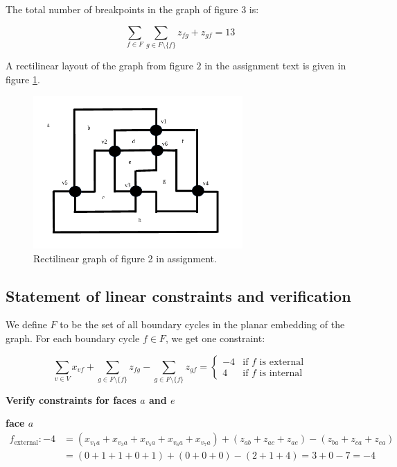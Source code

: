 The total number of breakpoints in the graph of figure 3 is:

$$ \sum_{f\in F} \sum_{g \in F \setminus{\{f\} }} {z_{fg} + z_{gf} }= 13$$

A rectilinear layout of the graph from figure $2$ in the assignment text is given in figure \ref{fig:reclayout}.

\begin{figure}
 \centering
 \includegraphics[keepaspectratio=true, width=80mm]{img/rectilinear_graph.png}
 \caption{Rectilinear graph of figure 2 in assignment.}
 \label{fig:reclayout}
\end{figure}

\pagebreak

\subsection{Statement of linear constraints and verification}

We define $F$ to be the set of all boundary cycles in the planar embedding of the graph. For each boundary cycle $f \in F$, we get one constraint:

$$\sum_{v \in V}{x_{vf}} + \sum_{g \in F \setminus \{f\}}{z_{fg}} - \sum_{g \in F \setminus \{f\}}{z_{gf}} =
\begin{cases} -4 & \text{if $f$ is external} \\ 4 & \text{if $f$ is internal}\end{cases}
$$

\textbf{Verify constraints for faces $a$ and $e$}

\textbf{face $a$}
\begin{align*}
  f_{\text{external}}: -4
  &= (x_{v_1a}+x_{v_3a}+x_{v_5a}+x_{v_6a}+x_{v_7a})
   + (z_{ab} + z_{ac} + z_{ae}) - (z_{ba} + z_{ca} + z_{ea})\\
  &= (0+1+1+0+1) + (0+0+0) - (2+1+4)  = 3 + 0 - 7 = -4
\end{align*}

